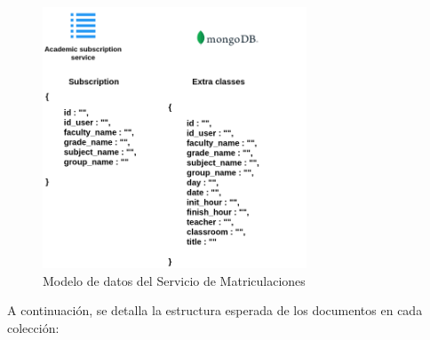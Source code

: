 \begin{figure}[H]
    \centering
    \includegraphics[width=0.7\textwidth, trim=0cm 0cm 2.5cm 0cm, clip]{figures/06_sub_db.png}
    \caption{Modelo de datos del Servicio de Matriculaciones}
    \label{fig:academic_subscription_service_er}
\end{figure}

A continuación, se detalla la estructura esperada de los documentos en cada colección:

